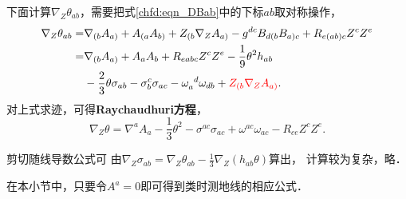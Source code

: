 下面计算$\nabla_Z \theta_{ab}$，需要把式\eqref{chfd:eqn_DBab}中的下标$ab$取对称操作，
\begin{equation}\label{chfd:eqn_Dtheta}
\begin{aligned}
    \nabla_Z \theta_{ab} = & %
     \nabla_{(b} A_{a)} + A_{(a} A_{b)} + Z_{(b}\nabla_Z A_{a)}
    -g^{dc} B_{d(b} B_{a)c} + R_{e(ab)c}Z^c Z^e  \\
    =& \nabla_{(b} A_{a)} + A_{a} A_{b}  + R_{eabc}Z^c Z^e
     -\frac{1}{9}\theta^2 h_{ab}  \\
     &- \frac{2}{3}\theta\sigma_{ab}
      - \sigma_{b}^c\sigma_{ac} - \omega_{a}^{\hphantom{a} d}\omega_{db}
      + {\color{red}Z_{(b}\nabla_Z A_{a)}} .
\end{aligned}
\end{equation} %
对上式求迹，可得{\bfseries \heiti Raychaudhuri方程}，
\begin{equation}\label{chfd:eqn_Raychaudhuri}
    \nabla_Z\theta= \nabla^{a} A_{a}
    - \frac{1}{3}\theta^2 - \sigma^{ac}\sigma_{ac}
    + \omega^{ac}\omega_{ac} - R_{ce}Z^c Z^e .
\end{equation}

剪切随线导数公式可
由$\nabla_Z \sigma_{ab}= \nabla_Z \theta_{ab} - \frac{1}{3} \nabla_Z(h_{ab}\theta)$算出，
计算较为复杂，略．

在本小节中，只要令$A^a=0$即可得到类时测地线的相应公式．









\printbibliography[heading=subbibliography,title=第\ref{chfd}章参考文献]
\endinput


